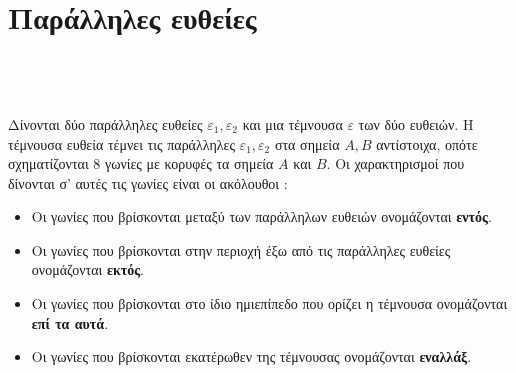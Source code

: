\documentclass[twoside,nofonts,ektypwsh,shmeiwseis]{thewria}
\begin{document}
\section{Παράλληλες ευθείες}
\orismoi
{}
\mbox{}\\\\\\
Δίνονται δύο παράλληλες ευθείες $ \varepsilon_1,\varepsilon_2 $ και μια τέμνουσα $ \varepsilon $ των δύο ευθειών. Η τέμνουσα ευθεία τέμνει τις παράλληλες $ \varepsilon_1,\varepsilon_2 $ στα σημεία $ A,B $ αντίστοιχα, οπότε σχηματίζονται 8 γωνίες με κορυφές τα σημεία $ A $ και $ B $. Οι χαρακτηρισμοί που δίνονται σ' αυτές τις γωνίες είναι οι ακόλουθοι :
\begin{itemize}[itemsep=0mm]
\item Οι γωνίες που βρίσκονται μεταξύ των παράλληλων ευθειών ονομάζονται \textbf{εντός}.
\item Οι γωνίες που βρίσκονται στην περιοχή έξω από τις παράλληλες ευθείες ονομάζονται \textbf{εκτός}.
\item Οι γωνίες που βρίσκονται στο ίδιο ημιεπίπεδο που ορίζει η τέμνουσα ονομάζονται \textbf{επί τα αυτά}.
\item Οι γωνίες που βρίσκονται εκατέρωθεν της τέμνουσας ονομάζονται \textbf{εναλλάξ}.
\end{itemize}
\end{document}
